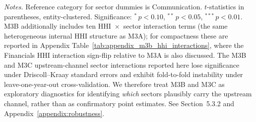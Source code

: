 \begin{table}[!htbp]
\begin{threeparttable}
\begin{tablenotes}[flushleft]
\footnotesize
\item \textit{Notes.} Reference category for sector dummies is Communication.
$t$-statistics in parentheses, entity-clustered. Significance:
$^{*}\,p<0.10$, $^{**}\,p<0.05$, $^{***}\,p<0.01$. M3B additionally includes
ten HHI~$\times$~sector interaction terms (the same heterogeneous internal
HHI structure as M3A); for compactness these are reported in Appendix
Table~\ref{tab:appendix_m3b_hhi_interactions}, where the Financials HHI
interaction sign-flip relative to M3A is also discussed. The M3B and M3C
upstream-channel sector interactions reported here lose significance under
Driscoll--Kraay standard errors and exhibit fold-to-fold instability under
leave-one-year-out cross-validation. We therefore treat M3B and M3C as
exploratory diagnostics for identifying \emph{which} sectors plausibly carry
the upstream channel, rather than as confirmatory point estimates. See
Section~5.3.2 and Appendix~\ref{appendix:robustness}.
\end{tablenotes}
\end{threeparttable}

\end{table}
